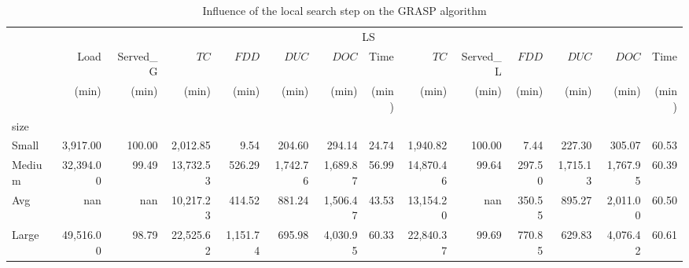 \begin{table}[htb]
\centering
\caption{Influence of the local search step on the GRASP algorithm}
\label{tab:grasp_ls_nols}
\begin{tabular}{lrrrrrrrrrrrrr}
\toprule
 & \multicolumn{13}{c}{LS} \\
 & Load & Served_G & $TC$ & $FDD$ & $DUC$ & $DOC$ & Time & $TC$ & Served_L & $FDD$ & $DUC$ & $DOC$ & Time \\
 & (min) & (min) & (min) & (min) & (min) & (min) & (min) & (min) & (min) & (min) & (min) & (min) & (min) \\
size &  &  &  &  &  &  &  &  &  &  &  &  &  \\
\midrule
Small & 3,917.00 & 100.00 & 2,012.85 & 9.54 & 204.60 & 294.14 & 24.74 & 1,940.82 & 100.00 & 7.44 & 227.30 & 305.07 & 60.53 \\
Medium & 32,394.00 & 99.49 & 13,732.53 & 526.29 & 1,742.76 & 1,689.87 & 56.99 & 14,870.46 & 99.64 & 297.50 & 1,715.13 & 1,767.95 & 60.39 \\
Avg & nan & nan & 10,217.23 & 414.52 & 881.24 & 1,506.47 & 43.53 & 13,154.20 & nan & 350.55 & 895.27 & 2,011.00 & 60.50 \\
Large & 49,516.00 & 98.79 & 22,525.62 & 1,151.74 & 695.98 & 4,030.95 & 60.33 & 22,840.37 & 99.69 & 770.85 & 629.83 & 4,076.42 & 60.61 \\
\bottomrule
\end{tabular}
\end{table}
